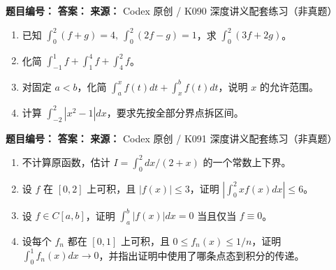 \begin{problemBox}
\begin{problemMeta}
\textbf{题目编号：}  \quad
\textbf{答案：}  \quad
\textbf{来源：} Codex 原创 / K090 深度讲义配套练习（非真题）
\end{problemMeta}
\begin{enumerate}
  \item[\textbf{A}] 已知 \(\int_0^2(f+g)=4,\ \int_0^2(2f-g)=1\)，求 \(\int_0^2(3f+2g)\)。
  \item[\textbf{B}] 化简 \(\int_{-1}^1f+\int_1^4f+\int_4^2f\)。
  \item[\textbf{C}] 对固定 \(a<b\)，化简 \(\int_a^xf(t)dt+\int_x^bf(t)dt\)，说明 \(x\) 的允许范围。
  \item[\textbf{M}] 计算 \(\int_{-2}^2|x^2-1|dx\)，要求先按全部分界点拆区间。
\end{enumerate}
\end{problemBox}

\begin{problemBox}
\begin{problemMeta}
\textbf{题目编号：}  \quad
\textbf{答案：}  \quad
\textbf{来源：} Codex 原创 / K091 深度讲义配套练习（非真题）
\end{problemMeta}
\begin{enumerate}
  \item[\textbf{A}] 不计算原函数，估计 \(I=\int_0^2dx/(2+x)\) 的一个常数上下界。
  \item[\textbf{B}] 设 \(f\) 在 \([0,2]\) 上可积，且 \(|f(x)|\le3\)，证明 \(\left|\int_0^2x f(x)dx\right|\le6\)。
  \item[\textbf{C}] 设 \(f\in C[a,b]\)，证明 \(\int_a^b|f(x)|dx=0\) 当且仅当 \(f\equiv0\)。
  \item[\textbf{M}] 设每个 \(f_n\) 都在 \([0,1]\) 上可积，且 \(0\le f_n(x)\le1/n\)，证明 \(\int_0^1f_n(x)dx\to0\)，并指出证明中使用了哪条点态到积分的传递。
\end{enumerate}
\end{problemBox}

